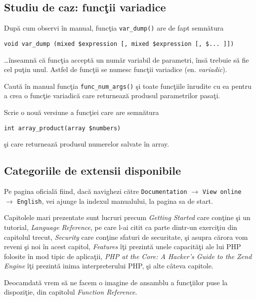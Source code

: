 \subsection{Studiu de caz: funcţii variadice}
După cum observi în manual, funcţia \texttt{var\_dump()}
are de fapt semnătura
\begin{verbatim}
void var_dump (mixed $expression [, mixed $expression [, $... ]])
\end{verbatim}
\ldots înseamnă că funcţia acceptă un număr variabil
de parametri, însă trebuie să fie cel puţin unul.
Astfel de funcţii se numesc funcţii variadice (en. \textsl{variadic}).

\begin{Exercise}[title={Crează o funcţie variadică}]
\ExePart
Caută în manual funcţia \texttt{func\_num\_args()} şi
toate funcţiile înrudite cu ea pentru a crea
o funcţie variadică care returnează produsul parametrilor
pasaţi.

\ExePart
Scrie o nouă versiune a funcţiei care are semnătura
\begin{verbatim}
int array_product(array $numbers)
\end{verbatim}
şi care returnează produsul numerelor salvate în array.

% 
\end{Exercise}


\subsection{Categoriile de extensii disponibile}
Pe pagina oficială fiind, dacă navighezi către
\texttt{Documentation} $\rightarrow$ \texttt{View online}
$\rightarrow$ \texttt{English},
vei ajunge la indexul
manualului, la pagina sa de start.

Capitolele mari prezentate sunt lucruri precum
\textit{Getting Started} care conţine şi un tutorial,
\textit{Language Reference}, pe care l-ai
citit ca parte dintr-un exerciţiu din capitolul trecut,
\textit{Security} care conţine sfaturi de securitate,
şi asupra cărora vom reveni şi noi
în acest capitol, \textit{Features} îţi prezintă
unele capacităţi ale lui PHP folosite
în mod tipic de aplicaţii, \textit{PHP at the Core: A Hacker's Guide to the Zend Engine}
îţi prezintă inima interpreterului PHP, şi alte câteva capitole.

Deocamdată vrem să ne facem o imagine de ansamblu a funcţiilor
puse la dispoziţie, din capitolul \textit{Function Reference}.

